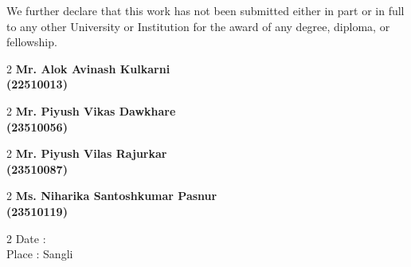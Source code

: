 \documentclass{article}
\begin{document}
	We further declare that this work has not been submitted either in part or in full to any other University or Institution for the award of any degree, diploma, or fellowship.
	
	\begin{multicols}{2}	
	\textbf{Mr. Alok Avinash Kulkarni\\ (22510013)}
	\end{multicols}
	\begin{multicols}{2}
	\textbf{Mr. Piyush Vikas Dawkhare\\ (23510056)}
	\end{multicols} 
	\begin{multicols}{2}
	\textbf{Mr. Piyush Vilas Rajurkar\\ (23510087)}
	\end{multicols} 
	\begin{multicols}{2}
	\textbf{Ms. Niharika Santoshkumar Pasnur\\ (23510119)}
	\end{multicols} 

	\vspace{0.8cm}
	\begin{multicols}{2}
	\noindent
	Date : \\
	Place : Sangli
	\columnbreak
	\end{multicols}
	
\end{document}
